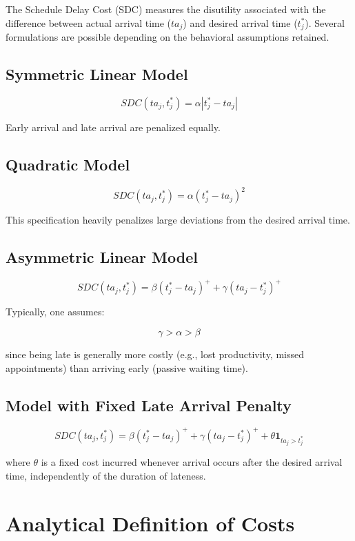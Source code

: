 \documentclass[12pt, a4paper]{article}
\begin{document}
The Schedule Delay Cost (SDC) measures the disutility associated with the difference between actual arrival time ($ta_j$) and desired arrival time ($t_j^*$). Several formulations are possible depending on the behavioral assumptions retained.

\subsection{Symmetric Linear Model}

$$
SDC(ta_j,t_j^*)=\alpha |t_j^*-ta_j|
$$

Early arrival and late arrival are penalized equally.

\subsection{Quadratic Model}

$$
SDC(ta_j,t_j^*)=\alpha (t_j^*-ta_j)^2
$$

This specification heavily penalizes large deviations from the desired arrival time.

\subsection{Asymmetric Linear Model}

$$
SDC(ta_j,t_j^*)=
\beta (t_j^*-ta_j)^+
+
\gamma (ta_j-t_j^*)^+
$$

Typically, one assumes:

$$
\gamma>\alpha>\beta
$$

since being late is generally more costly (e.g., lost productivity, missed appointments) than arriving early (passive waiting time).

\subsection{Model with Fixed Late Arrival Penalty}

$$
SDC(ta_j,t_j^*)=
\beta (t_j^*-ta_j)^+
+
\gamma (ta_j-t_j^*)^+
+
\theta \mathbf 1_{ta_j>t_j^*}
$$

where $\theta$ is a fixed cost incurred whenever arrival occurs after the desired arrival time, independently of the duration of lateness.

\section{Analytical Definition of Costs}
\end{document}
